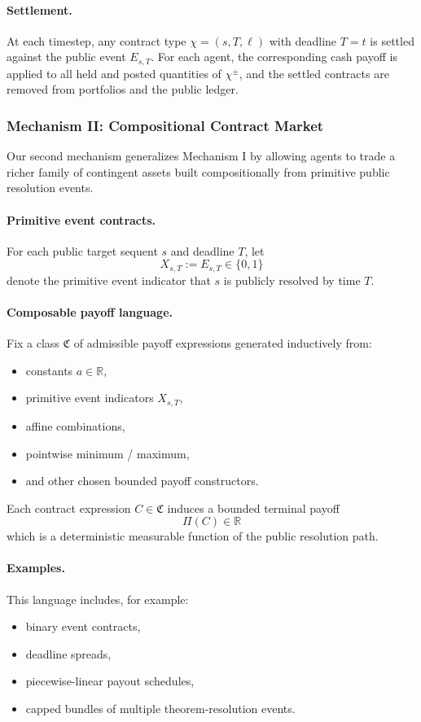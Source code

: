 \documentclass[letterpaper]{article} %
\begin{document}
\paragraph{Settlement.}
At each timestep, any contract type $\chi=(s,T,\ell)$ with deadline $T=t$ is settled against the public event $E_{s,T}$. For each agent, the corresponding cash payoff is applied to all held and posted quantities of $\chi^\pm$, and the settled contracts are removed from portfolios and the public ledger.





\subsubsection{Mechanism II: Compositional Contract Market}

Our second mechanism generalizes Mechanism I by allowing agents to trade a richer family of contingent assets built compositionally from primitive public resolution events.

\paragraph{Primitive event contracts.}
For each public target sequent $s$ and deadline $T$, let
\[
X_{s,T}:=E_{s,T}\in\{0,1\}
\]
denote the primitive event indicator that $s$ is publicly resolved by time $T$.

\paragraph{Composable payoff language.}
Fix a class $\mathfrak C$ of admissible payoff expressions generated inductively from:
\begin{itemize}
    \item constants $a\in\mathbb R$,
    \item primitive event indicators $X_{s,T}$,
    \item affine combinations,
    \item pointwise minimum / maximum,
    \item and other chosen bounded payoff constructors.
\end{itemize}
Each contract expression $C\in\mathfrak C$ induces a bounded terminal payoff
\[
\Pi(C)\in\mathbb R
\]
which is a deterministic measurable function of the public resolution path.

\paragraph{Examples.}
This language includes, for example:
\begin{itemize}
    \item binary event contracts,
    \item deadline spreads,
    \item piecewise-linear payout schedules,
    \item capped bundles of multiple theorem-resolution events.
\end{itemize}
\end{document}
